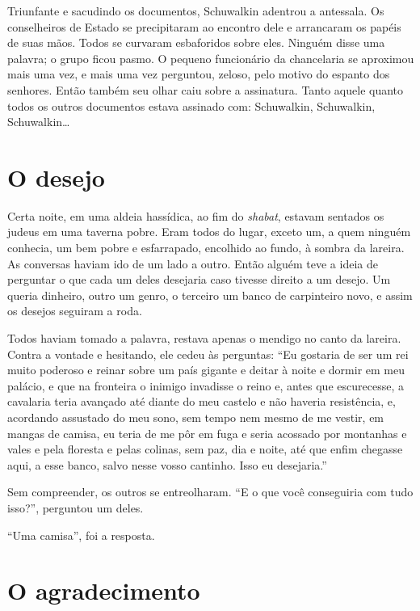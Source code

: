 Triunfante e sacudindo os documentos, Schuwalkin adentrou a antessala.
Os conselheiros de Estado se precipitaram ao encontro dele e arrancaram
os papéis de suas mãos. Todos se curvaram esbaforidos sobre eles.
Ninguém disse uma palavra; o grupo ficou pasmo. O pequeno funcionário da
chancelaria se aproximou mais uma vez, e mais uma vez perguntou, zeloso,
pelo motivo do espanto dos senhores. Então também seu olhar caiu sobre a
assinatura. Tanto aquele quanto todos os outros documentos estava
assinado com: Schuwalkin, Schuwalkin, Schuwalkin\ldots{}

\section{O desejo }

Certa noite, em uma aldeia hassídica, ao fim do \emph{shabat}, estavam
sentados os judeus em uma taverna pobre. Eram todos do lugar, exceto um,
a quem ninguém conhecia, um bem pobre e esfarrapado, encolhido ao fundo,
à sombra da lareira. As conversas haviam ido de um lado a outro. Então
alguém teve a ideia de perguntar o que cada um deles desejaria caso
tivesse direito a um desejo. Um queria dinheiro, outro um genro, o
terceiro um banco de carpinteiro novo, e assim os desejos seguiram a
roda.

Todos haviam tomado a palavra, restava apenas o mendigo no canto da
lareira. Contra a vontade e hesitando, ele cedeu às perguntas: ``Eu
gostaria de ser um rei muito poderoso e reinar sobre um país gigante e
deitar à noite e dormir em meu palácio, e que na fronteira o inimigo
invadisse o reino e, antes que escurecesse, a cavalaria teria avançado
até diante do meu castelo e não haveria resistência, e, acordando
assustado do meu sono, sem tempo nem mesmo de me vestir, em mangas de
camisa, eu teria de me pôr em fuga e seria acossado por montanhas e
vales e pela floresta e pelas colinas, sem paz, dia e noite, até que
enfim chegasse aqui, a esse banco, salvo nesse vosso cantinho. Isso eu
desejaria.''

Sem compreender, os outros se entreolharam. ``E o que você conseguiria
com tudo isso?'', perguntou um deles.

``Uma camisa'', foi a resposta.

\section{O agradecimento}

